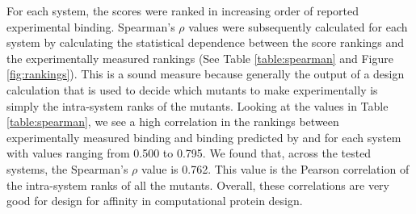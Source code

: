 For each system, the \ks scores were ranked in increasing order of reported experimental binding. Spearman's $\rho$ values were subsequently calculated for each system by calculating the statistical dependence between the \ks score rankings and the experimentally measured rankings (See Table \ref{table:spearman} and Figure \ref{fig:rankings}). This is a sound measure because generally the output of a design calculation that is used to decide which mutants to make experimentally is simply the intra-system ranks of the mutants. Looking at the values in Table \ref{table:spearman}, we see a high correlation in the rankings between experimentally measured binding and binding predicted by  and \ks for each system with values ranging from 0.500 to 0.795. We found that, across the tested systems, the Spearman's $\rho$ value is 0.762. This value is the Pearson correlation of the intra-system ranks of all the mutants.  Overall, these correlations are very good for design for affinity in computational protein design.      



